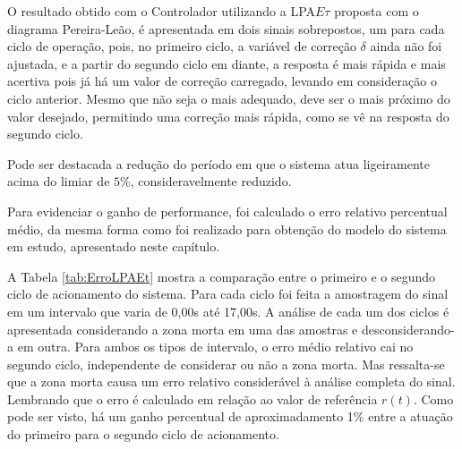 
O resultado obtido com o Controlador utilizando a 
LPA$E\tau$ proposta com o diagrama Pereira-Leão, é apresentada em dois sinais sobrepostos,
um para cada ciclo de operação, 
pois, no primeiro ciclo, a variável de correção $\delta$
ainda não foi ajustada, e a partir do segundo ciclo em diante, 
a resposta é mais rápida e mais acertiva pois já há um
valor de correção carregado, 
levando em consideração o ciclo anterior. 
Mesmo que não seja o mais adequado, 
deve ser o mais próximo do valor desejado, 
permitindo uma correção mais rápida, 
como se vê na resposta do segundo ciclo.


Pode ser destacada a redução do período em que o sistema atua
ligeiramente acima do limiar de $5\%$, consideravelmente reduzido.


Para evidenciar o ganho de performance, 
foi calculado o erro relativo percentual médio,
da mesma forma como foi realizado para obtenção do modelo
do sistema em estudo, 
apresentado neste capítulo.

A Tabela \ref{tab:ErroLPAEt} mostra
a comparação entre o primeiro e o segundo ciclo de acionamento do
sistema. Para cada ciclo foi feita a amostragem do sinal em um
intervalo que varia de 0,00s até 17,00s. A análise de cada um dos ciclos é
apresentada considerando a zona morta em uma das amostras e
desconsiderando-a em outra. Para ambos os tipos de intervalo, o erro médio
relativo cai no segundo ciclo, independente de considerar ou não a
zona morta. Mas ressalta-se que a zona morta causa um erro relativo
considerável à análise completa do sinal. Lembrando que o erro é
calculado em relação ao valor de referência $r(t)$. 
Como pode ser visto, há um ganho percentual de 
aproximadamento 1\% entre a atuação do primeiro 
para o segundo ciclo de acionamento. 



